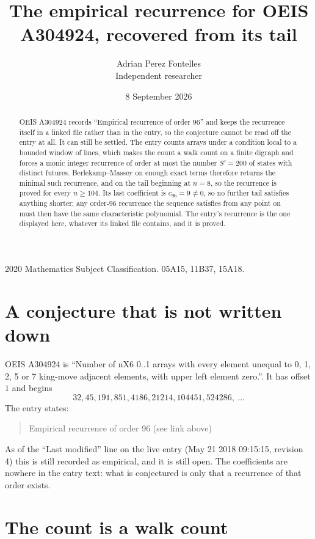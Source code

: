 \documentclass[11pt,a4paper]{article}
\title{The empirical recurrence for OEIS A304924, recovered from its tail}
\author{Adrian Perez Fontelles\\ \small Independent researcher}
\date{8 September 2026}
\theoremstyle{plain}
\theoremstyle{definition}
\begin{document}
\maketitle

\begin{abstract}
OEIS A304924 records ``Empirical recurrence of order $96$'' and keeps the recurrence itself in
a linked file rather than in the entry, so the conjecture cannot be read off the entry at all.
It can still be settled. The entry counts arrays under a condition local to a bounded window of
lines, which makes the count a walk count on a finite digraph and forces a monic integer
recurrence of order at most the number $S'=200$ of states with distinct futures. Berlekamp--Massey on
enough exact terms therefore returns the minimal such recurrence, and on the tail beginning at $n=8$, so the recurrence is proved for every $n\ge104$.
Its last coefficient is $c_{96}=9\neq0$, so no further tail satisfies anything
shorter; any order-$96$ recurrence the sequence satisfies from any point on must then have
the same characteristic polynomial. The entry's recurrence is the one displayed here, whatever
its linked file contains, and it is proved.
\end{abstract}

\noindent\small 2020 Mathematics Subject Classification. 05A15, 11B37, 15A18.\normalsize

\section{A conjecture that is not written down}

OEIS A304924 is ``Number of nX6 0..1 arrays with every element unequal to 0, 1, 2, 5 or 7 king-move adjacent elements, with upper left element zero.''. It has offset $1$ and begins
\[
32, 45, 191, 851, 4186, 21214, 104451, 524286,\ \dots
\]
The entry states:
\begin{quote}
Empirical recurrence of order 96 (see link above)
\end{quote}
As of the ``Last modified'' line on the live entry (May 21 2018 09:15:15, revision 4)
this is still recorded as empirical, and it is still open. The coefficients are nowhere in the
entry text: what is conjectured is only that a recurrence of that order exists.

\section{The count is a walk count}
\end{document}
